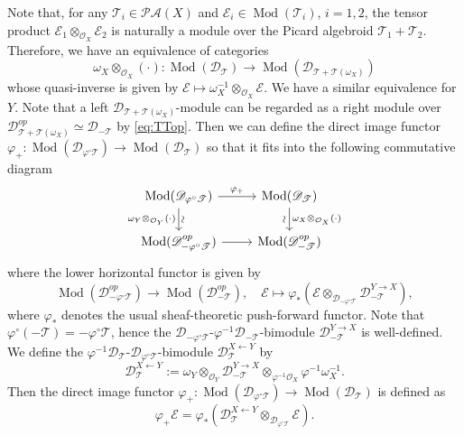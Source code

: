 \documentclass[11pt, a4paper]{amsart}
\newcommand*{\isovert}{\rotatebox{90}{\(\sim\)}}
\newcommand{\cE}{\mathcal{E}}
\newcommand{\sD}{\mathscr{D}}
\DeclareMathOperator{\Mod}{Mod}
\newcommand{\TT}{\mathscr{T}}
\newcommand{\PicAlg}{\mathscr{PA}}
\newcommand{\OO}{\mathcal{O}}
\theoremstyle{definition}
\numberwithin{equation}{section}
\begin{document}
Note that, for any $\TT_i \in \PicAlg(X)$ and $\cE_i \in \Mod(\TT_i)$, $i = 1,2$, the tensor product $\cE_1 \otimes_{\OO_X} \cE_2$ is naturally a module over the Picard algebroid $\TT_1 + \TT_2$. Therefore, we have an equivalence of categories
\[ 
	\omega_X \otimes_{\OO_X} (\cdot): \Mod(\sD_\TT) \to \Mod(\sD_{\TT + \TT(\omega_X)}) 
\]
whose quasi-inverse is given by $\cE \mapsto \omega_X^{-1} \otimes_{\OO_X} \cE$. We have a similar equivalence for $Y$. Note that a left $\sD_{\TT + \TT(\omega_X)}$-module can be regarded as a right module over $\sD_{\TT + \TT(\omega_X)}^{op} \simeq \sD_{-\TT}$ by \eqref{eq:TTop}. Then we can define the direct image functor $\varphi_+: \Mod(\sD_{\varphi^\circ \TT}) \to \Mod(\sD_{\TT})$ so that it fits into the following commutative diagram
\[
	\begin{tikzcd}
		\Mod(\sD_{\varphi^\circ \TT}) \ar[r, "\varphi_+"] \ar[d, "\isovert", "\omega_Y \otimes_{\OO_Y} (\cdot)"'] & \Mod(\sD_{\TT}) \ar[d, "\omega_X \otimes_{\OO_X} (\cdot)", "\isovert"'] \\
		\Mod(\sD_{-\varphi^\circ \TT}^{op}) \ar[r] & \Mod(\sD_{-\TT}^{op})
	\end{tikzcd}
\]
where the lower horizontal functor is given by 
\[ 
	\Mod(\sD_{-\varphi^\circ \TT}^{op}) \to \Mod(\sD_{-\TT}^{op}), \quad \cE \mapsto \varphi_* (\cE \otimes_{\sD_{-\varphi^\circ \TT}} \sD_{-\TT}^{Y \to X}),
\]
where $\varphi_*$ denotes the usual sheaf-theoretic push-forward functor. Note that $\varphi^\circ(-\TT) = -\varphi^\circ \TT$, hence the $\sD_{-\varphi^\circ \TT}$-$\varphi^{-1} \sD_{-\TT}$-bimodule $\sD_{-\TT}^{Y \to X}$ is well-defined. We define the $\varphi^{-1} \sD_{\TT}$-$\sD_{\varphi^\circ \TT}$-bimodule $\sD_{\TT}^{X \leftarrow Y}$ by
\[ 
	\sD_{\TT}^{X \leftarrow Y} := \omega_Y \otimes_{\OO_Y} \sD_{-\TT}^{Y \to X} \otimes_{\varphi^{-1} \OO_X} \varphi^{-1} \omega_X^{-1}.
\]
Then the direct image functor $\varphi_+: \Mod(\sD_{\varphi^\circ \TT}) \to \Mod(\sD_{\TT})$ is defined as
\[ 
	\varphi_+ \cE = \varphi_*(\sD_{\TT}^{X \leftarrow Y} \otimes_{\sD_{\varphi^\circ \TT}} \cE). 
\]
\end{document}

